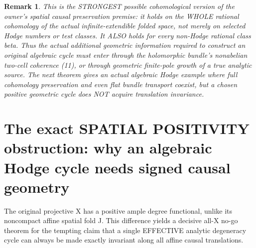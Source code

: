 \documentclass[11pt]{article}
\newtheorem{remark}[theorem]{Remark}
\begin{document}
\begin{remark}
This is the STRONGEST possible
cohomological version of the
owner's spatial causal
preservation premise:
it holds on the WHOLE rational
cohomology of the actual
infinite-extendible folded
space, not merely on selected
Hodge numbers or test classes.
It ALSO holds for every
non-Hodge rational class beta.
Thus the actual additional
geometric information required
to construct an original
algebraic cycle must enter
through the holomorphic
bundle's nonabelian two-cell
coherence (11), or through
geometric finite-pole growth
of a true analytic source.
The next theorem gives an
actual algebraic Hodge example
where full cohomology
preservation and even flat
bundle transport coexist,
but a chosen positive
geometric cycle does NOT
acquire translation invariance.
\end{remark}

\section{The exact SPATIAL POSITIVITY obstruction: why an algebraic Hodge cycle needs signed causal geometry}

The original projective X has a
positive ample degree functional,
unlike its noncompact affine
spatial fold J. This difference
yields a decisive all-X no-go
theorem for the tempting claim
that a single EFFECTIVE analytic
degeneracy cycle can always be
made exactly invariant along
all affine causal translations.
\end{document}

